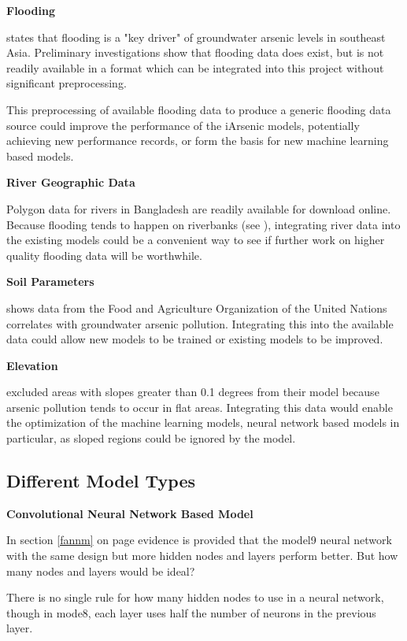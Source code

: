 \textbf{Flooding}

\cite{Connolly2022} states that flooding is a "key driver" of groundwater arsenic levels in southeast Asia. Preliminary investigations show that flooding data does exist, but is not readily available in a format which can be integrated into this project without significant preprocessing.

This preprocessing of available flooding data to produce a generic flooding data source could improve the performance of the iArsenic models, potentially achieving new performance records, or form the basis for new machine learning based models.

\textbf{River Geographic Data}

Polygon data for rivers in Bangladesh are readily available for download online. Because flooding tends to happen on riverbanks (see \cite{Connolly2022}), integrating river data into the existing models could be a convenient way to see if further work on higher quality flooding data will be worthwhile.

\textbf{Soil Parameters}

\cite{Winkel2008} shows data from the Food and Agriculture Organization of the United Nations correlates with groundwater arsenic pollution. Integrating this into the available data could allow new models to be trained or existing models to be improved.

\textbf{Elevation}

\cite{Connolly2022} excluded areas with slopes greater than 0.1 degrees from their model because arsenic pollution tends to occur in flat areas. Integrating this data would enable the optimization of the machine learning models, neural network based models in particular, as sloped regions could be ignored by the model.

\subsection{Different Model Types}

\textbf{Convolutional Neural Network Based Model}
\label{cnnbm}

In section \ref{fannm} on page \pageref{fannm} evidence is provided that the model9 neural network with the same design but more hidden nodes and layers perform better. But how many nodes and layers would be ideal?

There is no single rule for how many hidden nodes to use in a neural network, though in mode8, each layer uses half the number of neurons in the previous layer.

